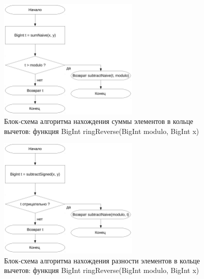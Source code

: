 \documentclass[a4paper,12pt]{article} %
\begin{document}
\begin{figure}[ht]
	\centering
	\includegraphics[width=0.6\textwidth]{lr5_sumRing.pdf}
	\caption{
		Блок-схема алгоритма нахождения суммы элементов в кольце вычетов:
		функция BigInt ringReverse(BigInt modulo, BigInt x)
	}
	\label{bs_plus}
\end{figure}

\begin{figure}[ht]
	\centering
	\includegraphics[width=0.6\textwidth]{lr5_subtractRing.pdf}
	\caption{
		Блок-схема алгоритма нахождения разности элементов в кольце вычетов:
		функция BigInt ringReverse(BigInt modulo, BigInt x)
	}
	\label{bs_minus}
\end{figure}
\end{document}
